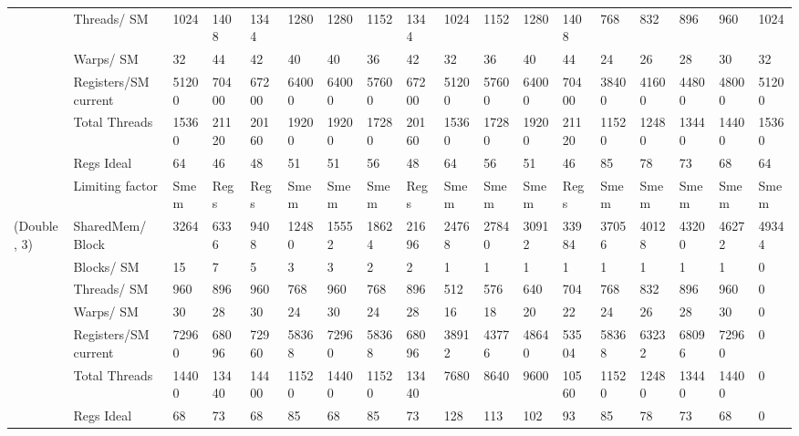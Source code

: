 \begin{tabular}{llllllllllllllllll}
            & Threads/ SM &   1024 &   1408 &   1344 &   1280 &   1280 &   1152 &   1344 &   1024 &   1152 &   1280 &   1408 &    768 &    832 &    896 &    960 &   1024 \\
            & Warps/ SM &     32 &     44 &     42 &     40 &     40 &     36 &     42 &     32 &     36 &     40 &     44 &     24 &     26 &     28 &     30 &     32 \\
            & Registers/SM current &  51200 &  70400 &  67200 &  64000 &  64000 &  57600 &  67200 &  51200 &  57600 &  64000 &  70400 &  38400 &  41600 &  44800 &  48000 &  51200 \\
            & Total Threads &  15360 &  21120 &  20160 &  19200 &  19200 &  17280 &  20160 &  15360 &  17280 &  19200 &  21120 &  11520 &  12480 &  13440 &  14400 &  15360 \\
            & Regs Ideal &     64 &     46 &     48 &     51 &     51 &     56 &     48 &     64 &     56 &     51 &     46 &     85 &     78 &     73 &     68 &     64 \\
            & Limiting factor &   Smem &   Regs &   Regs &   Smem &   Smem &   Smem &   Regs &   Smem &   Smem &   Smem &   Regs &   Smem &   Smem &   Smem &   Smem &   Smem \\
(Double, 3) & SharedMem/ Block &   3264 &   6336 &   9408 &  12480 &  15552 &  18624 &  21696 &  24768 &  27840 &  30912 &  33984 &  37056 &  40128 &  43200 &  46272 &  49344 \\
            & Blocks/ SM &     15 &      7 &      5 &      3 &      3 &      2 &      2 &      1 &      1 &      1 &      1 &      1 &      1 &      1 &      1 &      0 \\
            & Threads/ SM &    960 &    896 &    960 &    768 &    960 &    768 &    896 &    512 &    576 &    640 &    704 &    768 &    832 &    896 &    960 &      0 \\
            & Warps/ SM &     30 &     28 &     30 &     24 &     30 &     24 &     28 &     16 &     18 &     20 &     22 &     24 &     26 &     28 &     30 &      0 \\
            & Registers/SM current &  72960 &  68096 &  72960 &  58368 &  72960 &  58368 &  68096 &  38912 &  43776 &  48640 &  53504 &  58368 &  63232 &  68096 &  72960 &      0 \\
            & Total Threads &  14400 &  13440 &  14400 &  11520 &  14400 &  11520 &  13440 &   7680 &   8640 &   9600 &  10560 &  11520 &  12480 &  13440 &  14400 &      0 \\
            & Regs Ideal &     68 &     73 &     68 &     85 &     68 &     85 &     73 &    128 &    113 &    102 &     93 &     85 &     78 &     73 &     68 &      0 \\

\end{tabular}
